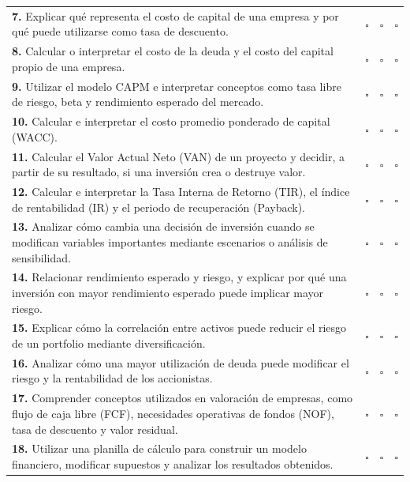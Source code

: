 \documentclass[12pt,a4paper]{article}
\begin{document}
\begin{table}[H]
\begin{tabularx}{\textwidth}{
    >{\raggedright\arraybackslash}X
    >{\centering\arraybackslash}p{1.8cm}
    >{\centering\arraybackslash}p{1.8cm}
    >{\centering\arraybackslash}p{1.8cm}
}
\textbf{7.} Explicar qué representa el costo de capital de una empresa y por qué puede utilizarse como tasa de descuento.
& $\square$ & $\square$ & $\square$ \\

\textbf{8.} Calcular o interpretar el costo de la deuda y el costo del capital propio de una empresa.
& $\square$ & $\square$ & $\square$ \\

\textbf{9.} Utilizar el modelo CAPM e interpretar conceptos como tasa libre de riesgo, beta y rendimiento esperado del mercado.
& $\square$ & $\square$ & $\square$ \\

\textbf{10.} Calcular e interpretar el costo promedio ponderado de capital (WACC).
& $\square$ & $\square$ & $\square$ \\

\textbf{11.} Calcular el Valor Actual Neto (VAN) de un proyecto y decidir, a partir de su resultado, si una inversión crea o destruye valor.
& $\square$ & $\square$ & $\square$ \\

\textbf{12.} Calcular e interpretar la Tasa Interna de Retorno (TIR), el índice de rentabilidad (IR) y el periodo de recuperación (Payback).
& $\square$ & $\square$ & $\square$ \\

\textbf{13.} Analizar cómo cambia una decisión de inversión cuando se modifican variables importantes mediante escenarios o análisis de sensibilidad.
& $\square$ & $\square$ & $\square$ \\

\textbf{14.} Relacionar rendimiento esperado y riesgo, y explicar por qué una inversión con mayor rendimiento esperado puede implicar mayor riesgo.
& $\square$ & $\square$ & $\square$ \\

\textbf{15.} Explicar cómo la correlación entre activos puede reducir el riesgo de un portfolio mediante diversificación.
& $\square$ & $\square$ & $\square$ \\

\textbf{16.} Analizar cómo una mayor utilización de deuda puede modificar el riesgo y la rentabilidad de los accionistas.
& $\square$ & $\square$ & $\square$ \\

\textbf{17.} Comprender conceptos utilizados en valoración de empresas, como flujo de caja libre (FCF), necesidades operativas de fondos (NOF), tasa de descuento y valor residual.
& $\square$ & $\square$ & $\square$ \\

\textbf{18.} Utilizar una planilla de cálculo para construir un modelo financiero, modificar supuestos y analizar los resultados obtenidos.
& $\square$ & $\square$ & $\square$ \\

\bottomrule
\end{tabularx}
\end{table}
\end{document}
